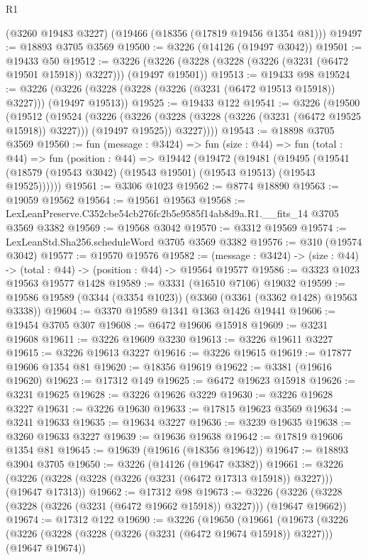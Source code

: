 \begin{lexlean}{R1}
\begin{coremodule}
    (@3260 @19483 @3227)
    (@19466 (@18356 (@17819 @19456 @1354 @81)))
@19497 := @18893 @3705 @3569
@19500 := @3226 (@14126 (@19497 @3042))
@19501 := @19433 @50
@19512 := @3226 (@3226 (@3228 (@3228 (@3226 (@3231 (@6472 @19501 @15918)) @3227))) (@19497 @19501))
@19513 := @19433 @98
@19524 := @3226 (@3226 (@3228 (@3228 (@3226 (@3231 (@6472 @19513 @15918)) @3227))) (@19497 @19513))
@19525 := @19433 @122
@19541 := @3226
    (@19500
      (@19512
        (@19524
          (@3226
            (@3226 (@3228 (@3228 (@3226 (@3231 (@6472 @19525 @15918)) @3227))) (@19497 @19525))
            @3227))))
@19543 := @18898 @3705 @3569
@19560 := fun (message : @3424) =>
  fun (size : @44) =>
  fun (total : @44) =>
  fun (position : @44) =>
  @19442
    (@19472
      (@19481
        (@19495 (@19541 (@18579 (@19543 @3042) (@19543 @19501) (@19543 @19513) (@19543 @19525))))))
@19561 := @3306 @1023
@19562 := @8774 @18890
@19563 := @19059 @19562
@19564 := @19561 @19563
@19568 := LexLeanPreserve.C352cbe54cb276fc2b5e9585f14ab8d9a.R1.__fits_14 @3705 @3569 @3382
@19569 := @19568 @3042
@19570 := @3312 @19569
@19574 := LexLeanStd.Sha256.scheduleWord @3705 @3569 @3382
@19576 := @310 (@19574 @3042)
@19577 := @19570 @19576
@19582 := (message : @3424) -> (size : @44) -> (total : @44) -> (position : @44) -> @19564 @19577
@19586 := @3323 @1023 @19563 @19577 @1428
@19589 := @3331 (@16510 @7106) @19032
@19599 := @19586 @19589 (@3344 (@3354 @1023)) (@3360 (@3361 (@3362 @1428) @19563 @3338))
@19604 := @3370 @19589 @1341 @1363 @1426 @19441
@19606 := @19454 @3705 @307
@19608 := @6472 @19606 @15918
@19609 := @3231 @19608
@19611 := @3226 @19609 @3230
@19613 := @3226 @19611 @3227
@19615 := @3226 @19613 @3227
@19616 := @3226 @19615
@19619 := @17877 @19606 @1354 @81
@19620 := @18356 @19619
@19622 := @3381 (@19616 @19620)
@19623 := @17312 @149
@19625 := @6472 @19623 @15918
@19626 := @3231 @19625
@19628 := @3226 @19626 @3229
@19630 := @3226 @19628 @3227
@19631 := @3226 @19630
@19633 := @17815 @19623 @3569
@19634 := @3241 @19633
@19635 := @19634 @3227
@19636 := @3239 @19635
@19638 := @3260 @19633 @3227
@19639 := @19636 @19638
@19642 := @17819 @19606 @1354 @81
@19645 := @19639 (@19616 (@18356 @19642))
@19647 := @18893 @3904 @3705
@19650 := @3226 (@14126 (@19647 @3382))
@19661 := @3226 (@3226 (@3228 (@3228 (@3226 (@3231 (@6472 @17313 @15918)) @3227))) (@19647 @17313))
@19662 := @17312 @98
@19673 := @3226 (@3226 (@3228 (@3228 (@3226 (@3231 (@6472 @19662 @15918)) @3227))) (@19647 @19662))
@19674 := @17312 @122
@19690 := @3226
    (@19650
      (@19661
        (@19673
          (@3226
            (@3226 (@3228 (@3228 (@3226 (@3231 (@6472 @19674 @15918)) @3227))) (@19647 @19674))

\end{coremodule}
\end{lexlean}
